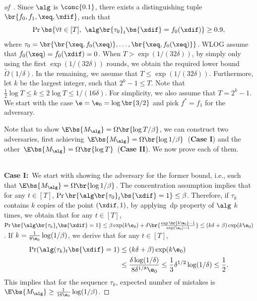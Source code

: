 \begin{proof}[of~]
    Since \(\alg\) is \(\conc{0.1}\), there exists a distinguishing tuple \(\br{f_0, f_1, \xeq, \xdif}\), such that 
    \begin{equation}
        \Pr \bs{\forall t \in [T],\ \alg \br{\tau_0}_t\bs{\xdif} = f_0(\xdif)} \geq 0.9,
    \end{equation}
    where \(\tau_0 = \br{\br{\xeq, f_0(\xeq)}, \ldots, \br{\xeq, f_0(\xeq)}}\).
    WLOG assume that \(f_0(\xeq) = f_0(\xdif) = 0\).
    When \(T > \exp(1 / (32\delta))\), by simply only using the first \(\exp(1 / (32\delta))\) rounds, we obtain the required lower bound \(\widetilde\Omega(1 / \delta)\). In the remaining, we assume that \(T \leq \exp(1 / (32\delta))\).
    Furthermore, let \(k\) be the largest integer, such that \(2^k - 1 \leq T\). 
    Note that \(\frac{1}{2}\log{T} \leq k \leq 2\log T \leq 1/(16\delta)\). 
    For simplicity, we also assume that \(T = 2^k - 1\). We start with the case \(\e = \e_0 = \log\br{3/2}\) and pick \(f^\ast = f_1\) for the adversary.
    
    Note that to show \(\E \bs{M_\alg} = \Omega\br{\log T / \beta}\), we can construct two adversaries, first achieving~\(\E \bs{M_\alg} = \Omega\br{\log 1 / \beta}\)~(\textbf{Case I}) and the other~\(\E \bs{M_\alg} = \Omega\br{\log T}\)~(\textbf{Case II}). We now prove each of them.\\~\
    
    \noindent\textbf{Case I:}~We start with showing the adversary for the former bound, i.e., such that \(\E \bs{M_\alg} = \Omega\br{\log 1 / \beta}\).
    The concentration assumption implies that for any \(t \in [T]\), \(\Pr\br{\alg\br{\tau_0}_t\bs{\xdif} = 1} \leq \beta\).
    Therefore, if \(\tau_k\) contains \(k\) copies of the point \((\xdif, 1)\),  by applying~\Gls{dp} property of \(\alg\) \(k\) times, we obtain that for any \(t \in [T]\),
    \(\Pr\br{\alg\br{\tau_k}_t\bs{\xdif} = 1} \leq \beta \exp(k \e_0) + \delta \br{\frac{\exp\br{k\e_0} - 1}{\exp(\e_0) - 1}} \leq (k \delta + \beta)\exp(k \e_0)\).
    If \(k = \frac{1}{8 \e_0} \log (1 / \beta)\), we derive that for any \(t \in [T]\), 
    \begin{equation}
    \begin{aligned}
        \Pr(\alg(\tau_k)_t\bs{\xdif} = 1) &\leq (k \delta + \beta) \exp(k \e_0) \\
        &\leq \frac{\delta \log (1/\delta)}{8 \delta^{1/8} \e_0} \leq \frac{1}{3} \delta^{1/2} \log (1 / \delta) \leq \frac{1}{2}.
    \end{aligned}
    \end{equation} This implies that for the sequence \(\tau_k\), expected number of mistakes is \(\E\bs{M_{\alg}} \geq \frac{1}{16 \e_0} \log (1 / \beta)\). 
    

\end{proof}
